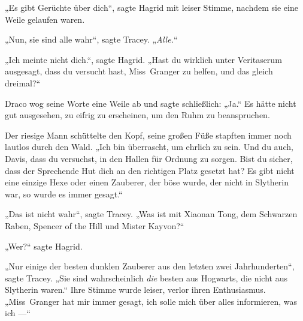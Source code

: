 „Es gibt Gerüchte über dich“, sagte Hagrid mit leiser Stimme, nachdem sie eine Weile gelaufen waren.

„Nun, sie sind alle wahr“, sagte Tracey.
„\emph{Alle.}“

„Ich meinte nicht dich.“, sagte Hagrid.
„Hast du wirklich unter Veritaserum ausgesagt, dass du versucht hast, Miss~Granger zu helfen, und das gleich dreimal?“

Draco wog seine Worte eine Weile ab und sagte schließlich:
„Ja.“ Es hätte nicht gut ausgesehen, zu eifrig zu erscheinen, um den Ruhm zu beanspruchen.

Der riesige Mann schüttelte den Kopf, seine großen Füße stapften immer noch lautlos durch den Wald.
„Ich bin überrascht, um ehrlich zu sein. Und du auch, Davis, dass du versuchst, in den Hallen für Ordnung zu sorgen. Bist du sicher, dass der Sprechende Hut dich an den richtigen Platz gesetzt hat? Es gibt nicht eine einzige Hexe oder einen Zauberer, der böse wurde, der nicht in Slytherin war, so wurde es immer gesagt.“

„Das ist nicht wahr“, sagte Tracey.
„Was ist mit Xiaonan Tong, dem Schwarzen Raben, Spencer of the Hill und Mister Kayvon?“

„Wer?“ sagte Hagrid.

„Nur einige der besten dunklen Zauberer aus den letzten zwei Jahrhunderten“, sagte Tracey.
„Sie sind wahrscheinlich \emph{die} besten aus Hogwarts, die nicht aus Slytherin waren.“ Ihre Stimme wurde leiser, verlor ihren Enthusiasmus.
„Miss~Granger hat mir immer gesagt, ich solle mich über alles informieren, was ich —“

